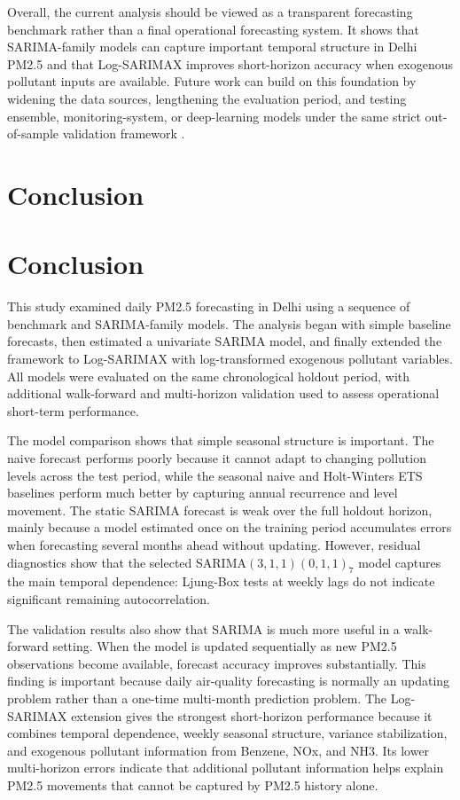 \documentclass[11pt]{article}
\newcommand{\chapternumber}[2][]{%
  \phantomsection%
  \def\chaptertitle{#2}%
  \if\relax\detokenize{#1}\relax
    \section*{#2}%
    \addcontentsline{toc}{section}{#2}%
  \else
    \section*{#1 \textbar{} #2}%
    \addcontentsline{toc}{section}{#1 \textbar{} #2}%
  \fi
}
\begin{document}
Overall, the current analysis should be viewed as a transparent forecasting benchmark rather than a final operational forecasting system. It shows that SARIMA-family models can capture important temporal structure in Delhi PM2.5 and that Log-SARIMAX improves short-horizon accuracy when exogenous pollutant inputs are available. Future work can build on this foundation by widening the data sources, lengthening the evaluation period, and testing ensemble, monitoring-system, or deep-learning models under the same strict out-of-sample validation framework \cite{necula2025,wang2022,cheng2026}.


\chapternumber{Conclusion}
This study examined daily PM2.5 forecasting in Delhi using a sequence of benchmark and SARIMA-family models. The analysis began with simple baseline forecasts, then estimated a univariate SARIMA model, and finally extended the framework to Log-SARIMAX with log-transformed exogenous pollutant variables. All models were evaluated on the same chronological holdout period, with additional walk-forward and multi-horizon validation used to assess operational short-term performance.

The model comparison shows that simple seasonal structure is important. The naive forecast performs poorly because it cannot adapt to changing pollution levels across the test period, while the seasonal naive and Holt-Winters ETS baselines perform much better by capturing annual recurrence and level movement. The static SARIMA forecast is weak over the full holdout horizon, mainly because a model estimated once on the training period accumulates errors when forecasting several months ahead without updating. However, residual diagnostics show that the selected SARIMA$(3,1,1)(0,1,1)_7$ model captures the main temporal dependence: Ljung-Box tests at weekly lags do not indicate significant remaining autocorrelation.

The validation results also show that SARIMA is much more useful in a walk-forward setting. When the model is updated sequentially as new PM2.5 observations become available, forecast accuracy improves substantially. This finding is important because daily air-quality forecasting is normally an updating problem rather than a one-time multi-month prediction problem. The Log-SARIMAX extension gives the strongest short-horizon performance because it combines temporal dependence, weekly seasonal structure, variance stabilization, and exogenous pollutant information from Benzene, NOx, and NH3. Its lower multi-horizon errors indicate that additional pollutant information helps explain PM2.5 movements that cannot be captured by PM2.5 history alone.
\end{document}
